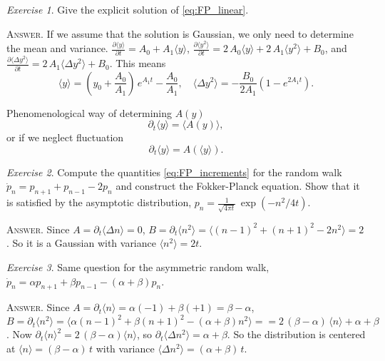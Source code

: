\documentclass{book}
\numberwithin{equation}{section}
\theoremstyle{plain}
\theoremstyle{definition}
\theoremstyle{remark}
\theoremstyle{BoldStyle}
\newtheorem{exercise}{Exercise}
\numberwithin{exercise}{section}
\newcommand{\answer}[1]{{\color{DarkBlue}\footnotesize \textsc{Answer.} #1}}
\begin{document}
\begin{exercise}
  Give the explicit solution of \eqref{eq:FP_linear}.

  \answer{If we assume that the solution is Gaussian,
    we only need to determine the mean and variance.
    $\frac{ \partial \langle y \rangle } { \partial t}
    = A_0 + A_1 \langle y \rangle$,
    $\frac{ \partial \langle y^2 \rangle } { \partial t}
    = 2 \, A_0 \langle y \rangle + 2 \, A_1 \langle y^2 \rangle + B_0$,
    and
    $\frac{ \partial \langle \Delta y^2 \rangle } { \partial t}
    = 2 \, A_1 \langle \Delta y^2 \rangle + B_0$.
    This means
    $$
    \langle y \rangle = \left(y_0 + \frac{A_0}{A_1} \right) \, e^{A_1 t} - \frac{A_0}{A_1},
    \quad
    \langle \Delta y^2 \rangle = -\frac{B_0}{2 A_1} (1 - e^{2A_1 t}).
    $$
  }
\end{exercise}


Phenomenological way of determining $A(y)$
\begin{equation}
\partial_t \langle y \rangle
= \langle A(y) \rangle,
\end{equation}
or if we neglect fluctuation
$$
\partial_t \langle y \rangle
= A(\langle y \rangle).
$$


\begin{exercise}
  Compute the quantities \eqref{eq:FP_increments}
  for the random walk $\dot p_n = p_{n+1} + p_{n-1} - 2 p_n$
  and construct the Fokker-Planck equation.
  Show that it is satisfied by the asymptotic distribution,
  $p_n = \frac{1}{\sqrt{4\pi t}} \, \exp(-n^2/4t)$.

  \answer{Since
    $A = \partial_t \langle \Delta n \rangle = 0$,
    $B = \partial_t \langle n^2 \rangle = \langle (n-1)^2 + (n+1)^2 - 2n^2 \rangle = 2$.
    So it is a Gaussian with variance $\langle n^2 \rangle = 2t$.
  }
\end{exercise}

\begin{exercise}
  Same question for the asymmetric random walk,
  $\dot p_n = \alpha p_{n+1} + \beta p_{n-1} - (\alpha + \beta) p_n$.

  \answer{Since
    $A = \partial_t \langle n \rangle = \alpha (-1) + \beta (+1) = \beta - \alpha$,
    $B = \partial_t \langle n^2 \rangle
    = \langle \alpha (n-1)^2 + \beta (n+1)^2 - (\alpha + \beta) n^2 \rangle =
    = 2 \, (\beta - \alpha) \, \langle n \rangle + \alpha + \beta$.
    Now
    $\partial_t \langle n \rangle^2 = 2 \, (\beta - \alpha) \langle n \rangle$,
    so
    $\partial_t \langle \Delta n^2 \rangle
    = \alpha + \beta$.
    So the distribution is centered at
    $\langle n \rangle = (\beta - \alpha) \, t$
    with variance $\langle \Delta n^2 \rangle = (\alpha + \beta) \, t$.
  }
\end{exercise}
\end{document}
